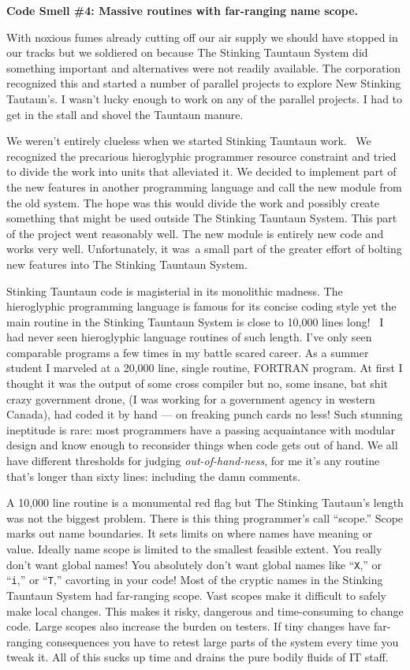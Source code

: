 \medskip
\noindent\textbf{Code Smell \#4: Massive routines with far-ranging name scope.}
\medskip

With noxious fumes already cutting off our air supply we should have
stopped in our tracks but we soldiered on because The Stinking Tauntaun
System did something important and alternatives were not readily
available. The corporation recognized this and started a number of
parallel projects to explore New Stinking Tautaun's. I wasn't lucky
enough to work on any of the parallel projects. I had to get in the
stall and shovel the Tauntaun manure.

We weren't entirely clueless when we started Stinking Tauntaun work.~ We
recognized the precarious hieroglyphic programmer resource constraint
and tried to divide the work into units that alleviated it. We decided
to implement part of the new features in another programming language
and call the new module from the old system. The hope was this would
divide the work and possibly create something that might be used outside
The Stinking Tauntaun System. This part of the project went reasonably
well. The new module is entirely new code and works very well.
Unfortunately, it was~a small part of the greater effort of bolting new
features into The Stinking Tauntaun System.

Stinking Tauntaun code is magisterial in its monolithic madness. The
hieroglyphic programming language is famous for its concise coding style
yet the main routine in the Stinking Tauntaun System is close to 10,000
lines long!~ I had never seen hieroglyphic language routines of such
length. I've only seen comparable programs a few times in my battle
scared career. As a summer student I marveled at a 20,000 line, single
routine, FORTRAN program. At first I thought it was the output of some
cross compiler but no, some insane, bat shit crazy government drone, (I
was working for a government agency in western Canada), had coded it by
hand --- on freaking punch cards no less! Such stunning ineptitude is
rare: most programmers have a passing acquaintance with modular design
and know enough to reconsider things when code gets out of hand. We all
have different thresholds for judging \emph{out-of-hand-ness}, for me
it's any routine that's longer than sixty lines: including the damn
comments.

A 10,000 line routine is a monumental red flag but The Stinking
Tautaun's length was not the biggest problem. There is this thing
programmer's call ``scope.'' Scope marks out name boundaries. It sets
limits on where names have meaning or value. Ideally name scope is
limited to the smallest feasible extent. You really don't want global
names! You absolutely don't want global names like ``\texttt{X},'' or ``\texttt{i},'' or
``\texttt{T},'' cavorting in your code! Most of the cryptic names in the Stinking
Tauntaun System had far-ranging scope. Vast scopes make it difficult to
safely make local changes. This makes it risky, dangerous and
time-consuming to change code. Large scopes also increase the burden on
testers. If tiny changes have far-ranging consequences you have to
retest large parts of the system every time you tweak it. All of this
sucks up time and drains the pure bodily fluids of IT staff.

